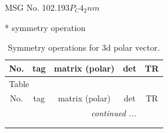 \documentclass[fleqn,8pt]{jsarticle}
\begin{document}
\setcounter{MaxMatrixCols}{32}

\renewcommand{\tablename}{Table~}
\renewcommand{\figurename}{Figure~}
\begin{center}
\LARGE
MSG No. 102.193\quad$P_{C}4_{2}nm$
\end{center}
* symmetry operation
\renewcommand{\arraystretch}{1.3}
\begin{longtable}{ccccc}
\caption{Symmetry operations for 3d polar vector.}
 \\
 \hline \hline
No. & tag & matrix (polar) & det & TR \\ \hline \endfirsthead

\multicolumn{4}{l}{\tablename\ \thetable{}} \\
 \hline \hline
No. & tag & matrix (polar) & det & TR \\ \hline \endhead

 \hline \hline
\multicolumn{4}{r}{\footnotesize\it continued ...} \\ \endfoot

 \hline \hline
\multicolumn{4}{r}{} \\ \endlastfoot


\end{longtable}
\end{document}
